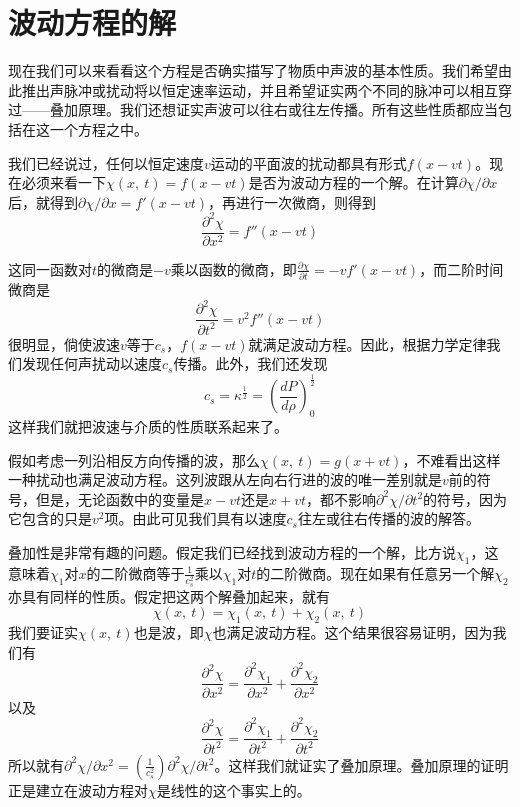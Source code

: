 \section{波动方程的解}

现在我们可以来看看这个方程是否确实描写了物质中声波的基本性质。我们希望由此推出声脉冲或扰动将以恒定速率运动，并且希望证实两个不同的脉冲可以相互穿过——叠加原理。我们还想证实声波可以往右或往左传播。所有这些性质都应当包括在这一个方程之中。

我们已经说过，任何以恒定速度$v$运动的平面波的扰动都具有形式$f(x-vt)$。现在必须来看一下$\chi (x,~t)=f(x-vt)$是否为波动方程的一个解。在计算$\partial \chi /\partial x$后，就得到$\partial\chi /\partial x =f'(x-vt)$，再进行一次微商，则得到
\begin{equation}
    \label{Eq:I:47:15}
    \frac{\partial^2\chi}{\partial x^2} = f''(x-vt)
\end{equation}

这同一函数对$t$的微商是$-v$乘以函数的微商，即$\frac{\partial\chi}{\partial t}=-vf'(x-vt)$，而二阶时间微商是
\begin{equation}
    \label{Eq:I:47:16}
    \frac{\partial^2\chi}{\partial t^2} = v^2 f''(x-vt)
\end{equation}
很明显，倘使波速$v$等于$c_s$，$f(x-vt)$就满足波动方程。因此，根据力学定律我们发现任何声扰动以速度$c_s$传播。此外，我们还发现
\begin{equation*}
    c_s = \kappa^{\frac{1}{2}}=\left(\frac{dP}{d\rho}\right)^{\frac{1}{2}}_0
\end{equation*}
这样我们就把波速与介质的性质联系起来了。

假如考虑一列沿相反方向传播的波，那么$\chi(x,~t)=g(x+vt)$，不难看出这样一种扰动也满足波动方程。这列波跟从左向右行进的波的唯一差别就是$v$前的符号，但是，无论函数中的变量是$x-vt$还是$x+vt$，都不影响$\partial^2 \chi /\partial t^2$的符号，因为它包含的只是$v^2$项。由此可见我们具有以速度$c_s$往左或往右传播的波的解答。

叠加性是非常有趣的问题。假定我们已经找到波动方程的一个解，比方说$\chi_1$，这意味着$\chi_1$对$x$的二阶微商等于$\frac{1}{c_s^2}$乘以$\chi_1$对$t$的二阶微商。现在如果有任意另一个解$\chi_2$亦具有同样的性质。假定把这两个解叠加起来，就有
\begin{equation}
    \label{Eq:I:47:17}
    \chi(x,~t)=\chi_1(x,~t)+\chi_2(x,~t)
\end{equation}
我们要证实$\chi(x,~t)$也是波，即$\chi$也满足波动方程。这个结果很容易证明，因为我们有
\begin{equation}
    \label{Eq:I:47:18}
    \frac{\partial^2\chi}{\partial x^2} = \frac{\partial^2\chi_1}{\partial x^2} + \frac{\partial^2\chi_2}{\partial x^2}
\end{equation}
以及
\begin{equation}
    \label{Eq:I:47:19}
    \frac{\partial^2\chi}{\partial t^2} = \frac{\partial^2\chi_1}{\partial t^2} + \frac{\partial^2\chi_2}{\partial t^2}
\end{equation}
所以就有$\partial^2\chi/\partial x^2 = \left(\frac{1}{c_s^2}\right)\partial^2\chi/\partial t^2$。这样我们就证实了叠加原理。叠加原理的证明正是建立在波动方程对$\chi$是线性的这个事实上的。

